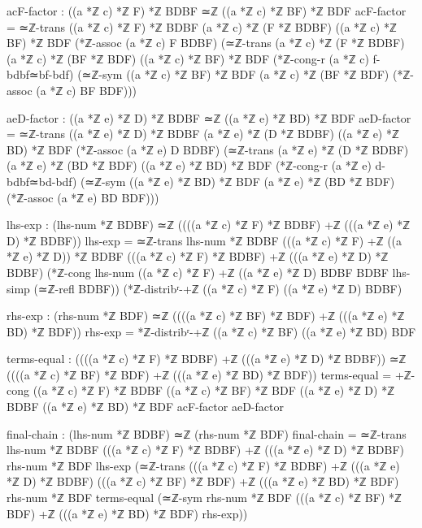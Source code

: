 \documentclass[11pt,a4paper]{book}
\begin{document}
\begin{code}
        acF-factor : ((a *ℤ c) *ℤ F) *ℤ BDBF ≃ℤ ((a *ℤ c) *ℤ BF) *ℤ BDF
        acF-factor = ≃ℤ-trans {((a *ℤ c) *ℤ F) *ℤ BDBF} {(a *ℤ c) *ℤ (F *ℤ BDBF)} {((a *ℤ c) *ℤ BF) *ℤ BDF}
                      (*ℤ-assoc (a *ℤ c) F BDBF)
                      (≃ℤ-trans {(a *ℤ c) *ℤ (F *ℤ BDBF)} {(a *ℤ c) *ℤ (BF *ℤ BDF)} {((a *ℤ c) *ℤ BF) *ℤ BDF}
                        (*ℤ-cong-r (a *ℤ c) f-bdbf≃bf-bdf)
                        (≃ℤ-sym {((a *ℤ c) *ℤ BF) *ℤ BDF} {(a *ℤ c) *ℤ (BF *ℤ BDF)} (*ℤ-assoc (a *ℤ c) BF BDF)))

        aeD-factor : ((a *ℤ e) *ℤ D) *ℤ BDBF ≃ℤ ((a *ℤ e) *ℤ BD) *ℤ BDF  
        aeD-factor = ≃ℤ-trans {((a *ℤ e) *ℤ D) *ℤ BDBF} {(a *ℤ e) *ℤ (D *ℤ BDBF)} {((a *ℤ e) *ℤ BD) *ℤ BDF}
                      (*ℤ-assoc (a *ℤ e) D BDBF)
                      (≃ℤ-trans {(a *ℤ e) *ℤ (D *ℤ BDBF)} {(a *ℤ e) *ℤ (BD *ℤ BDF)} {((a *ℤ e) *ℤ BD) *ℤ BDF}
                        (*ℤ-cong-r (a *ℤ e) d-bdbf≃bd-bdf)
                        (≃ℤ-sym {((a *ℤ e) *ℤ BD) *ℤ BDF} {(a *ℤ e) *ℤ (BD *ℤ BDF)} (*ℤ-assoc (a *ℤ e) BD BDF)))
        
        lhs-exp : (lhs-num *ℤ BDBF) ≃ℤ ((((a *ℤ c) *ℤ F) *ℤ BDBF) +ℤ (((a *ℤ e) *ℤ D) *ℤ BDBF))
        lhs-exp = ≃ℤ-trans {lhs-num *ℤ BDBF} {(((a *ℤ c) *ℤ F) +ℤ ((a *ℤ e) *ℤ D)) *ℤ BDBF}
                   {(((a *ℤ c) *ℤ F) *ℤ BDBF) +ℤ (((a *ℤ e) *ℤ D) *ℤ BDBF)}
                   (*ℤ-cong {lhs-num} {((a *ℤ c) *ℤ F) +ℤ ((a *ℤ e) *ℤ D)} {BDBF} {BDBF}
                            lhs-simp (≃ℤ-refl BDBF))
                   (*ℤ-distribʳ-+ℤ ((a *ℤ c) *ℤ F) ((a *ℤ e) *ℤ D) BDBF)
                   
        rhs-exp : (rhs-num *ℤ BDF) ≃ℤ ((((a *ℤ c) *ℤ BF) *ℤ BDF) +ℤ (((a *ℤ e) *ℤ BD) *ℤ BDF))
        rhs-exp = *ℤ-distribʳ-+ℤ ((a *ℤ c) *ℤ BF) ((a *ℤ e) *ℤ BD) BDF

        terms-equal : ((((a *ℤ c) *ℤ F) *ℤ BDBF) +ℤ (((a *ℤ e) *ℤ D) *ℤ BDBF)) ≃ℤ 
                      ((((a *ℤ c) *ℤ BF) *ℤ BDF) +ℤ (((a *ℤ e) *ℤ BD) *ℤ BDF))
        terms-equal = +ℤ-cong {((a *ℤ c) *ℤ F) *ℤ BDBF} {((a *ℤ c) *ℤ BF) *ℤ BDF}
                              {((a *ℤ e) *ℤ D) *ℤ BDBF} {((a *ℤ e) *ℤ BD) *ℤ BDF}
                              acF-factor aeD-factor

        final-chain : (lhs-num *ℤ BDBF) ≃ℤ (rhs-num *ℤ BDF)
        final-chain = ≃ℤ-trans {lhs-num *ℤ BDBF} 
                        {(((a *ℤ c) *ℤ F) *ℤ BDBF) +ℤ (((a *ℤ e) *ℤ D) *ℤ BDBF)}
                        {rhs-num *ℤ BDF}
                        lhs-exp
                        (≃ℤ-trans {(((a *ℤ c) *ℤ F) *ℤ BDBF) +ℤ (((a *ℤ e) *ℤ D) *ℤ BDBF)}
                                  {(((a *ℤ c) *ℤ BF) *ℤ BDF) +ℤ (((a *ℤ e) *ℤ BD) *ℤ BDF)}
                                  {rhs-num *ℤ BDF}
                                  terms-equal
                                  (≃ℤ-sym {rhs-num *ℤ BDF}
                                          {(((a *ℤ c) *ℤ BF) *ℤ BDF) +ℤ (((a *ℤ e) *ℤ BD) *ℤ BDF)}
                                          rhs-exp))
\end{code}
\end{document}
